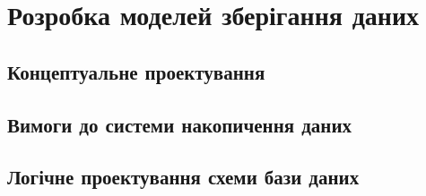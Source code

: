 \documentclass[oneside,14pt]{extarticle}
\begin{document}
\section{Розробка моделей зберігання даних}
\subsection{Концептуальне проектування}

\subsection{Вимоги до системи накопичення даних}




\subsection{Логічне проектування схеми бази даних}
\end{document}
